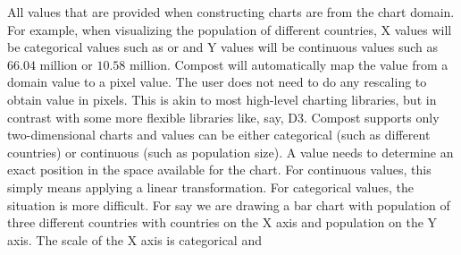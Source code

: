 \documentclass{jfp}
\begin{document}
All values that are provided when constructing charts are from the chart domain. For example,
when visualizing the population of different countries, X values will be categorical values
such as  or  and Y values will be continuous values
such as $\num{66.04}$ million or $\num{10.58}$ million. Compost will automatically map the value
from a domain value to a pixel value. The user does not need to do any rescaling to obtain
value in pixels. This is akin to most high-level charting libraries, but in contrast with some
more flexible libraries like, say, D3.
Compost supports only two-dimensional charts and values can be either categorical (such as
different countries) or continuous (such as population size). A value needs to determine an
exact position in the space available for the chart. For continuous values, this simply means
applying a linear transformation. For categorical values, the situation is more difficult. For %
say we are drawing a bar chart with population of three different countries with countries
on the X axis and population on the Y axis. The scale of the X axis is categorical and
\end{document}
